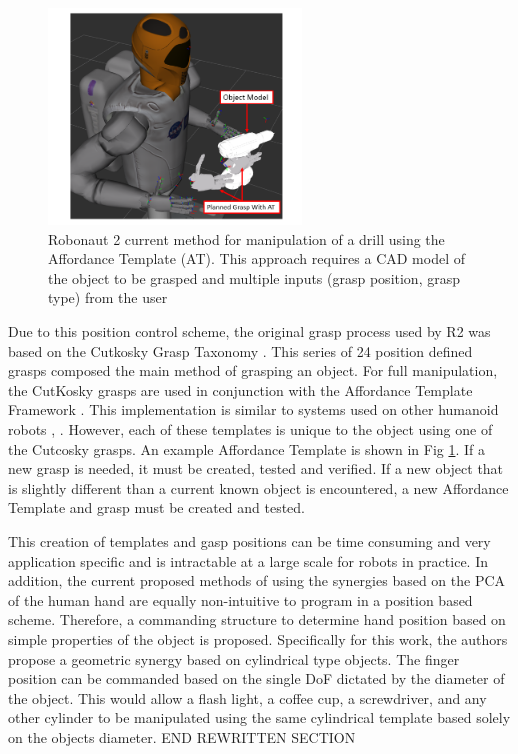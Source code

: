 \documentclass[runningheads,a4paper]{llncs}
\begin{document}
   \begin{figure}[t]
      \centering
      \includegraphics[width=0.6\textwidth]{drill_at2}
      \caption{Robonaut 2 current method for manipulation of a drill using the Affordance Template (AT).  This approach requires a CAD model of the object to be grasped and multiple inputs (grasp position, grasp type) from the user}
      \label{at_example}
   \end{figure}

Due to this position control scheme, the original grasp process used by R2 was based on the Cutkosky Grasp Taxonomy \cite{Cutkosky}. This series of 24 position defined grasps composed the main method of grasping an object. For full manipulation, the CutKosky grasps are used in conjunction with the Affordance Template Framework \cite{affordance_templates}. This implementation is similar to systems used on other humanoid robots \cite{DRC_Yanco}, \cite{IHMC}. However, each of these templates is unique to the object using one of the Cutcosky grasps. An example Affordance Template is shown in Fig \ref{at_example}. If a new grasp is needed, it must be created, tested and verified. If a new object that is slightly different than a current known object is encountered, a new Affordance Template and grasp must be created and tested. 

This creation of templates and gasp positions can be time consuming and very application specific and is intractable at a large scale for robots in practice. In addition, the current proposed methods of using the synergies based on the PCA of the human hand are equally non-intuitive to program in a position based scheme. Therefore, a commanding structure to determine hand position based on simple properties of the object is proposed. Specifically for this work, the authors propose a geometric synergy based on cylindrical type objects. The finger position can be commanded based on the single DoF dictated by the diameter of the object. This would allow a flash light, a coffee cup, a screwdriver, and any other cylinder to be manipulated using the same cylindrical template based solely on the objects diameter. 
END REWRITTEN SECTION
\end{document}
